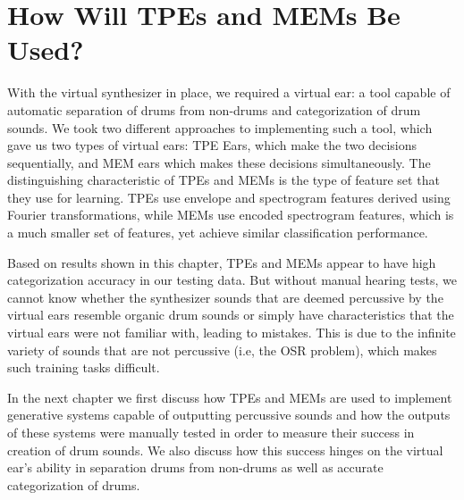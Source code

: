 \documentclass[\main/thesis.tex]{subfiles}
\begin{document}

\section{How Will TPEs and MEMs Be Used?}
With the virtual synthesizer in place, we required a virtual ear: a tool capable of automatic separation of drums from non-drums and categorization of drum sounds.  We took two different approaches to implementing such a tool, which gave us two types of virtual ears: TPE Ears, which make the two decisions sequentially, and MEM ears which makes these decisions simultaneously. The distinguishing characteristic of TPEs and MEMs is the type of feature set that they use for learning. TPEs use envelope and spectrogram features derived using Fourier transformations, while MEMs use encoded spectrogram features, which is a much smaller set of features, yet achieve similar classification performance.  

 Based on results shown in this chapter, TPEs and MEMs appear to have high categorization accuracy in our testing data. But without manual hearing tests, we cannot know whether the synthesizer sounds that are deemed percussive by the virtual ears resemble organic drum sounds or simply have characteristics that the virtual ears were not familiar with, leading to mistakes. This is due to the infinite variety of sounds that are not percussive (i.e, the OSR problem), which makes such training tasks difficult. 
 
In the next chapter we first discuss how TPEs and MEMs are used to implement generative systems capable of outputting percussive sounds and how the outputs of these systems were manually tested in order to measure their success in creation of drum sounds. We also discuss how this success hinges on the virtual ear's ability in separation drums from non-drums as well as accurate categorization of drums. 

 
\end{document}
